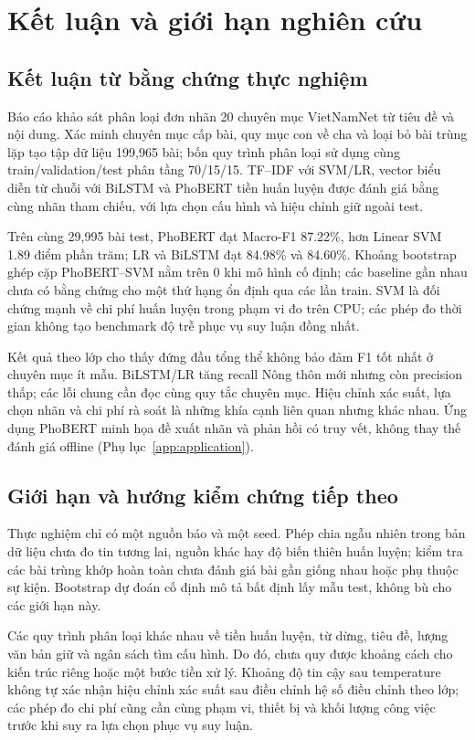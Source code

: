 \chapter{Kết luận và giới hạn nghiên cứu}\label{chap:conclusion}
\section{Kết luận từ bằng chứng thực nghiệm}
Báo cáo khảo sát phân loại đơn nhãn 20 chuyên mục VietNamNet từ tiêu đề và nội dung. Xác minh chuyên mục cấp bài, quy mục con về cha và loại bỏ bài trùng lặp tạo tập dữ liệu 199,965 bài; bốn quy trình phân loại sử dụng cùng train/validation/test phân tầng 70/15/15. TF--IDF với SVM/LR, vector biểu diễn từ chuỗi với BiLSTM và PhoBERT tiền huấn luyện được đánh giá bằng cùng nhãn tham chiếu, với lựa chọn cấu hình và hiệu chỉnh giữ ngoài test.

Trên cùng 29,995 bài test, PhoBERT đạt Macro-F1 87.22\%, hơn Linear SVM 1.89 điểm phần trăm; LR và BiLSTM đạt 84.98\% và 84.60\%. Khoảng bootstrap ghép cặp PhoBERT--SVM nằm trên 0 khi mô hình cố định; các baseline gần nhau chưa có bằng chứng cho một thứ hạng ổn định qua các lần train. SVM là đối chứng mạnh về chi phí huấn luyện trong phạm vi đo trên CPU; các phép đo thời gian không tạo benchmark độ trễ phục vụ suy luận đồng nhất.

Kết quả theo lớp cho thấy đứng đầu tổng thể không bảo đảm F1 tốt nhất ở chuyên mục ít mẫu. BiLSTM/LR tăng recall Nông thôn mới nhưng còn precision thấp; các lỗi chung cần đọc cùng quy tắc chuyên mục. Hiệu chỉnh xác suất, lựa chọn nhãn và chi phí rà soát là những khía cạnh liên quan nhưng khác nhau. Ứng dụng PhoBERT minh họa đề xuất nhãn và phản hồi có truy vết, không thay thế đánh giá offline (Phụ lục~\ref{app:application}).

\section{Giới hạn và hướng kiểm chứng tiếp theo}
Thực nghiệm chỉ có một nguồn báo và một seed. Phép chia ngẫu nhiên trong bản dữ liệu chưa đo tin tương lai, nguồn khác hay độ biến thiên huấn luyện; kiểm tra các bài trùng khớp hoàn toàn chưa đánh giá bài gần giống nhau hoặc phụ thuộc sự kiện. Bootstrap dự đoán cố định mô tả bất định lấy mẫu test, không bù cho các giới hạn này.

Các quy trình phân loại khác nhau về tiền huấn luyện, từ dừng, tiêu đề, lượng văn bản giữ và ngân sách tìm cấu hình. Do đó, chưa quy được khoảng cách cho kiến trúc riêng hoặc một bước tiền xử lý. Khoảng độ tin cậy sau temperature không tự xác nhận hiệu chỉnh xác suất sau điều chỉnh hệ số điều chỉnh theo lớp; các phép đo chi phí cũng cần cùng phạm vi, thiết bị và khối lượng công việc trước khi suy ra lựa chọn phục vụ suy luận.


